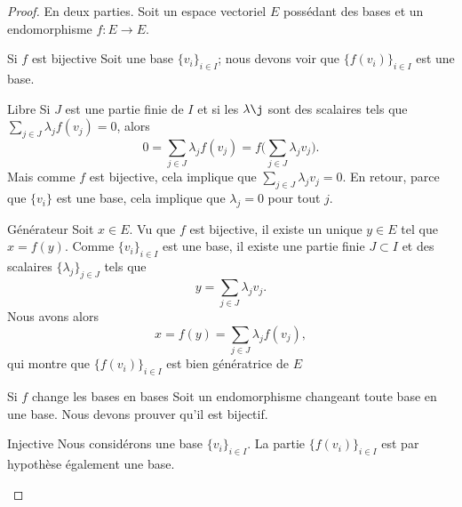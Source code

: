 \begin{proof}
    En deux parties. Soit un espace vectoriel \( E\) possédant des bases et un endomorphisme \( f\colon E\to E\).
    \begin{subproof}
        \item[Si \( f\) est bijective]
            Soit une base \( \{ v_i \}_{i\in I}\); nous devons voir que \( \{ f(v_i) \}_{i\in I}\) est une base.
            \begin{subproof}
                \item[Libre]
                    Si \( J\) est une partie finie de \( I\) et si les \( \lambda\j\) sont des scalaires tels que \( \sum_{j\in J}\lambda_jf(v_j)=0\), alors
                    \begin{equation}
                        0=\sum_{j\in J}\lambda_jf(v_j)=f\big( \sum_{j\in J}\lambda_jv_j \big).
                    \end{equation}
                    Mais comme \( f\) est bijective, cela implique que \( \sum_{j\in J}\lambda_jv_j=0\). En retour, parce que \( \{ v_i \}\) est une base, cela implique que \( \lambda_j=0\) pour tout \( j\).
                \item[Générateur]
                    Soit \( x\in E\). Vu que \( f\) est bijective, il existe un unique \( y\in E\) tel que \( x=f(y)\). Comme \( \{ v_i \}_{i\in I}\) est une base, il existe une partie finie \( J\subset I\) et des scalaires \( \{ \lambda_j \}_{j\in J}\) tels que
                    \begin{equation}
                        y=\sum_{j\in J}\lambda_jv_j.
                    \end{equation}
                    Nous avons alors
                    \begin{equation}
                        x=f(y)=\sum_{j\in J}\lambda_jf(v_j),
                    \end{equation}
                    qui montre que \( \{ f(v_i) \}_{i\in I}\) est bien génératrice de \( E\)
            \end{subproof}
        \item[Si \( f\) change les bases en bases]
            Soit un endomorphisme changeant toute base en une base. Nous devons prouver qu'il est bijectif.
            \begin{subproof}
                \item[Injective]
                    Nous considérons une base \( \{ v_i \}_{i\in I}\). La partie \( \{ f(v_i) \}_{i\in I}\) est par hypothèse également une base.


\end{subproof}
\end{subproof}
\end{proof}
